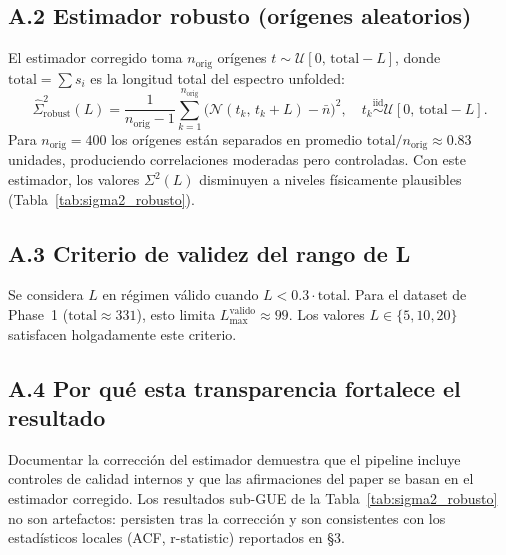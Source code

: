 \documentclass[12pt, a4paper]{article}
\begin{document}
\subsection*{A.2 Estimador robusto (orígenes aleatorios)}

El estimador corregido toma $n_\text{orig}$ orígenes
$t \sim \mathcal{U}[0,\, \text{total} - L]$, donde
$\text{total} = \sum s_i$ es la longitud total del espectro unfolded:
\[
  \hat{\Sigma}^2_\text{robust}(L)
    = \frac{1}{n_\text{orig}-1}
      \sum_{k=1}^{n_\text{orig}}
      \bigl(\mathcal{N}(t_k,\,t_k+L) - \bar{n}\bigr)^2,
  \quad t_k \overset{\text{iid}}{\sim} \mathcal{U}[0,\,\text{total}-L].
\]
Para $n_\text{orig} = 400$ los orígenes están separados en promedio
$\text{total}/n_\text{orig} \approx 0.83$ unidades, produciendo
correlaciones moderadas pero controladas. Con este estimador, los
valores $\Sigma^2(L)$ disminuyen a niveles físicamente plausibles
(Tabla~\ref{tab:sigma2_robusto}).

\subsection*{A.3 Criterio de validez del rango de L}

Se considera $L$ en régimen válido cuando $L < 0.3 \cdot \text{total}$.
Para el dataset de Phase~1 ($\text{total} \approx 331$), esto limita
$L_\text{max}^\text{valido} \approx 99$. Los valores $L \in \{5, 10, 20\}$
satisfacen holgadamente este criterio.

\subsection*{A.4 Por qué esta transparencia fortalece el resultado}

Documentar la corrección del estimador demuestra que el pipeline
incluye controles de calidad internos y que las afirmaciones del
paper se basan en el estimador corregido. Los resultados sub-GUE
de la Tabla~\ref{tab:sigma2_robusto} no son artefactos: persisten
tras la corrección y son consistentes con los estadísticos locales
(ACF, r-statistic) reportados en §3.
\end{document}
